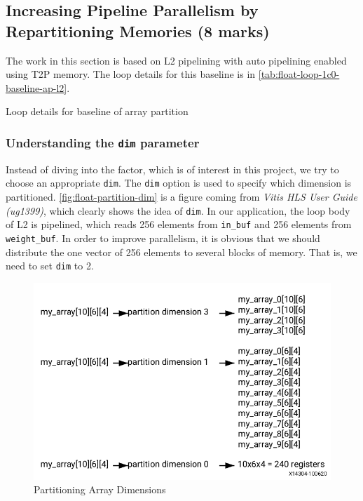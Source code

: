 \subsection{Increasing Pipeline Parallelism by Repartitioning Memories (8 marks)}\label{sec:1c}

The work in this section is based on L2 pipelining with auto pipelining enabled using T2P memory.
The loop details for this baseline is in \autoref{tab:float-loop-1c0-baseline-ap-l2}.

\begin{table}[ht!]
    \caption{Loop details for baseline of array partition}
    \label{tab:float-loop-1c0-baseline-ap-l2}
    \centering
    
\end{table}


\subsubsection{Understanding the \texttt{dim} parameter}\label{sec:1cDim}

Instead of diving into the factor, which is of interest in this project,
we try to choose an appropriate \texttt{dim}.
The \texttt{dim} option is used to specify which dimension is partitioned.
\autoref{fig:float-partition-dim} is a figure coming from \textit{Vitis HLS User Guide (ug1399)}, which clearly shows the idea of \texttt{dim}.
In our application, the loop body of L2 is pipelined, which reads 256 elements from \texttt{in\_buf} and 256 elements from \texttt{weight\_buf}.
In order to improve parallelism, it is obvious that we should distribute the one vector of 256 elements to several blocks of memory.
That is, we need to set \texttt{dim} to 2.

\begin{figure}[ht!]
    \centering
    \includegraphics[scale=0.5]{images/float-partition-dim.png}
    \caption{Partitioning Array Dimensions}
    \label{fig:float-partition-dim}
\end{figure}

